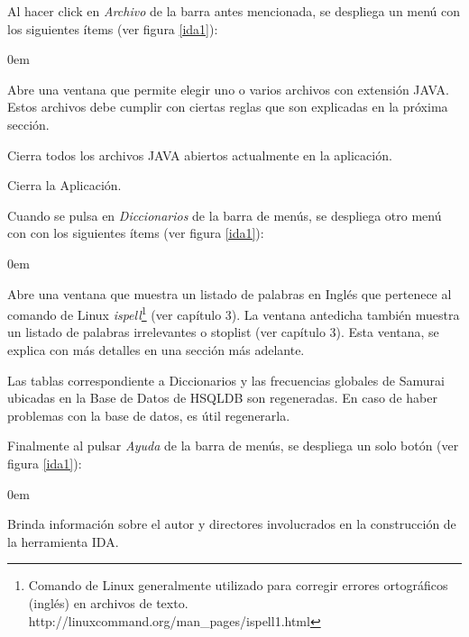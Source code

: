 \documentclass[a4paper,12pt]{report}
\begin{document}
Al hacer click en \textit{Archivo} de la barra antes mencionada, se despliega un menú con los siguientes ítems (ver figura \ref{ida1}):

\begin{description}
\itemsep0em%
\item[Abrir archivo(s) JAVA:] Abre una ventana que permite elegir uno o varios archivos con extensión JAVA. Estos archivos debe cumplir con ciertas reglas que son explicadas en la próxima sección.
\item[Cerrar Todo:] Cierra todos los archivos JAVA abiertos actualmente en la aplicación.
\item[Salir:] Cierra la Aplicación.
\end{description}

Cuando se pulsa en \textit{Diccionarios} de la barra de menús, se despliega otro menú con con los siguientes ítems (ver figura \ref{ida1}):

\begin{description}
\itemsep0em%

\item[Ver Diccionarios:] Abre una ventana que muestra un listado de palabras en Inglés que pertenece al comando de Linux \textit{ispell}\footnote[1]{Comando de Linux generalmente utilizado para corregir errores ortográficos (inglés) en archivos de texto. http://linuxcommand.org/man\_pages/ispell1.html} (ver capítulo 3). La ventana antedicha también muestra un listado de palabras irrelevantes o stoplist (ver capítulo 3). Esta ventana, se explica con más detalles en una sección más adelante.


\item[Restablecer B.D.(Base de Datos):] Las tablas correspondiente a Diccionarios y las frecuencias globales de Samurai ubicadas en la Base de Datos de HSQLDB son regeneradas. En caso de haber problemas con la base de datos, es útil regenerarla.

\end{description}

Finalmente al pulsar \textit{Ayuda} de la barra de menús, se despliega un solo botón (ver figura \ref{ida1}):

\begin{description}
\itemsep0em%
\item[Acerca de:] Brinda información sobre el autor y directores involucrados en la construcción de la herramienta IDA.
\end{description}
\end{document}
